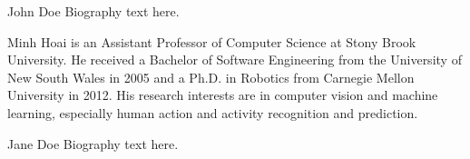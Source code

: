 \documentclass[10pt,journal,compsoc]{IEEEtran}
\begin{document}
\begin{IEEEbiographynophoto}{John Doe}
Biography text here.
\end{IEEEbiographynophoto}

 \begin{IEEEbiography}{Minh Hoai}
is an Assistant Professor of Computer Science at Stony Brook University. He received a Bachelor of Software Engineering from the University of New South Wales in 2005 and a Ph.D. in Robotics from Carnegie Mellon University in 2012. His research interests are in computer vision and machine learning, especially human action and activity recognition and prediction. 
\end{IEEEbiography}

\begin{IEEEbiographynophoto}{Jane Doe}
Biography text here.
\end{IEEEbiographynophoto}






\end{document}
